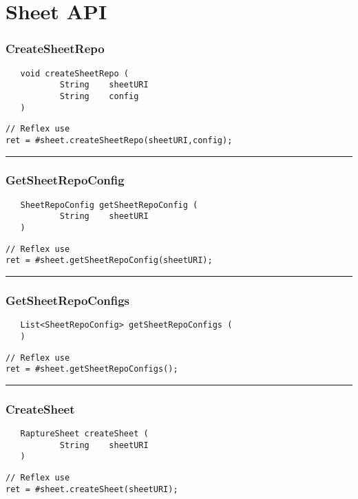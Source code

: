 \section{Sheet API}

\subsubsection{CreateSheetRepo}
\label{Api:CreateSheetRepo}
\begin{verbatim}
   void createSheetRepo (
           String    sheetURI
           String    config
   )
\end{verbatim}
\begin{lstlisting}[language=reflex]
// Reflex use
ret = #sheet.createSheetRepo(sheetURI,config);
\end{lstlisting}



\rule{15cm}{2pt}
\subsubsection{GetSheetRepoConfig}
\label{Api:GetSheetRepoConfig}
\begin{verbatim}
   SheetRepoConfig getSheetRepoConfig (
           String    sheetURI
   )
\end{verbatim}
\begin{lstlisting}[language=reflex]
// Reflex use
ret = #sheet.getSheetRepoConfig(sheetURI);
\end{lstlisting}



\rule{15cm}{2pt}
\subsubsection{GetSheetRepoConfigs}
\label{Api:GetSheetRepoConfigs}
\begin{verbatim}
   List<SheetRepoConfig> getSheetRepoConfigs (
   )
\end{verbatim}
\begin{lstlisting}[language=reflex]
// Reflex use
ret = #sheet.getSheetRepoConfigs();
\end{lstlisting}



\rule{15cm}{2pt}
\subsubsection{CreateSheet}
\label{Api:CreateSheet}
\begin{verbatim}
   RaptureSheet createSheet (
           String    sheetURI
   )
\end{verbatim}
\begin{lstlisting}[language=reflex]
// Reflex use
ret = #sheet.createSheet(sheetURI);
\end{lstlisting}



